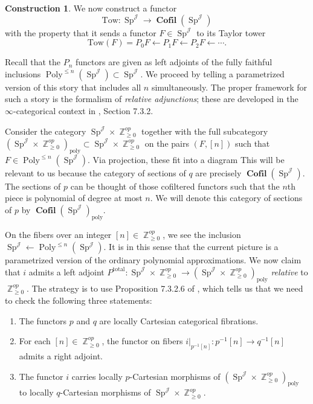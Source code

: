 \documentclass[reqno, oneside]{amsart}
\theoremstyle{definition}
\newtheorem{cnstr}[nul]{Construction}
\theoremstyle{plain}
\DeclareMathOperator{\Z}{\mathbb{Z}}
\DeclareMathOperator{\Poly}{\text{Poly}}
\DeclareMathOperator{\Sp}{\text{Sp}}
\DeclareMathOperator{\J}{\mathcal{J}}
\DeclareMathOperator{\Cofil}{\textbf{Cofil}}
\begin{document}
\begin{cnstr}\label{cnstr:tower}
We now construct a functor $$\text{Tow}: \Sp^{\J} \to \Cofil(\Sp^{\J})$$ with the property that it sends a functor $F\in \Sp^{\J}$ to its Taylor tower $$\text{Tow}(F) = P_0F \longleftarrow P_1F \longleftarrow P_2F \longleftarrow \cdots.$$


Recall that the $P_n$ functors are given as left adjoints of the fully faithful inclusions $\Poly^{\leq n}(\Sp^{\J}) \subset \Sp^{\J}$.  We proceed by telling a parametrized version of this story that includes all $n$ simultaneously.  The proper framework for such a story is the formalism of \emph{relative adjunctions}; these are developed in the $\infty$-categorical context in \cite{HA}, Section 7.3.2.  

Consider the category $\Sp^{\J}\times \Z^{op}_{\geq 0}$ together with the full subcategory $(\Sp^{\J}\times \Z^{op}_{\geq 0})_{\text{poly}} \subset \Sp^{\J}\times \Z^{op}_{\geq 0}$ on the pairs $(F, [n])$ such that $F\in \Poly^{\leq n}(\Sp^{\J}).$  Via projection, these fit into a diagram
 This will be relevant to us because the category of sections of $q$ are precisely $\Cofil(\Sp^{\J}).$  The sections of $p$ can be thought of those cofiltered functors such that the $n$th piece is polynomial of degree at most $n$.  We will denote this category of sections of $p$ by $\Cofil(\Sp^{\J})_{\text{poly}}.$ 

On the fibers over an integer $[n] \in \Z^{op}_{\geq 0}$, we see the inclusion $\Sp^{\J} \leftarrow \Poly^{\leq n}(\Sp^{\J}).$  It is in this sense that the current picture is a parametrized version of the ordinary polynomial approximations.  We now claim that $i$ admits a left adjoint $P^{\text{total}}: \Sp^{\J}\times \Z^{op}_{\geq 0} \to (\Sp^{\J}\times \Z^{op}_{\geq 0})_{\text{poly}}$ \emph{relative} to $\Z^{op}_{\geq 0}.$    The strategy is to use Proposition 7.3.2.6 of \cite{HA}, which tells us that we need to check the following three statements:
\begin{enumerate}
\item The functors $p$ and $q$ are locally Cartesian categorical fibrations.
\item For each $[n]\in \Z^{op}_{\geq 0}$, the functor on fibers $i|_{p^{-1}[n]}:p^{-1}[n] \to q^{-1}[n]$ admits a right adjoint.  
\item The functor $i$ carries locally $p$-Cartesian morphisms of $(\Sp^{\J}\times \Z^{op}_{\geq 0})_{\text{poly}}$ to locally $q$-Cartesian morphisms of $\Sp^{\J}\times \Z^{op}_{\geq 0}$.
\end{enumerate}


\end{cnstr}
\end{document}
